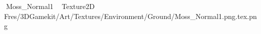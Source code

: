    Moss_Normal1             	   Texture2D
   F   res/3DGamekit/Art/Textures/Environment/Ground/Moss_Normal1.png.tex.png